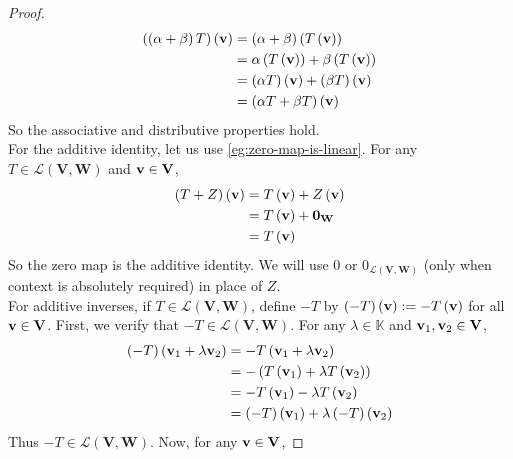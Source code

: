 \begin{proof}
   \begin{align*}
    \left( \left( \alpha + \beta \right)T \right)\left( \vb{v} \right) &= \left( \alpha + \beta \right) \left( T \left( \vb{v} \right) \right) \\
    &= \alpha \left( T \left( \vb{v} \right) \right) + \beta \left( T \left( \vb{v} \right) \right) \\
    &= \left( \alpha T \right) \left( \vb{v} \right) + \left(  \beta T \right) \left(  \vb{v} \right)\\ 
    &= \left(  \alpha T + \beta T \right) \left( \vb{v} \right)
   \end{align*}
   So the associative and distributive properties hold. \\ 
   For the additive identity, let us use \cref{eg:zero-map-is-linear}. For any \( T \in \mathcal{L} \left( \mathbf{V}, \mathbf{W} \right) \) and \( \vb{v} \in \mathbf{V} \), 
   \begin{align*}
    \left( T+Z \right) \left( \vb{v} \right) &= T \left( \vb{v} \right) + Z \left( \vb{v} \right) \\
    &= T \left( \vb{v} \right) + \vb{0}_{\mathbf{W}} \\
    &= T \left( \vb{v} \right)
   \end{align*}
   So the zero map is the additive identity. We will use \( 0 \)  or \( 0_{\mathcal{L} \left( \mathbf{V}, \mathbf{W} \right)} \) (only when context is absolutely required) in place of \( Z \). \\ 
   For additive inverses, if \( T \in \mathcal{L} \left( \mathbf{V}, \mathbf{W} \right) \), define \( -T \) by \( \left( -T \right)\left( \vb{v} \right) := -T \left( \vb{v} \right) \) for all \( \vb{v} \in \mathbf{V} \). First, we verify that \( -T \in \mathcal{L} \left( \mathbf{V}, \mathbf{W} \right) \). For any \( \lambda \in \mathbb{K} \) and \( \vb{v}_{1}, \vb{v}_{2} \in \mathbf{V} \),
   \begin{align*}
       \left( -T \right)\left( \vb{v}_{1} + \lambda \vb{v}_{2} \right) &= -T \left( \vb{v}_{1} + \lambda \vb{v}_{2} \right) \\
       &= -\left( T \left( \vb{v}_{1} \right) + \lambda T \left( \vb{v}_{2} \right) \right) \\
       &= -T \left( \vb{v}_{1} \right) - \lambda T \left( \vb{v}_{2} \right) \\
       &= \left( -T \right)\left( \vb{v}_{1} \right) + \lambda \left( -T \right)\left( \vb{v}_{2} \right)
   \end{align*}
   Thus \( -T \in \mathcal{L} \left( \mathbf{V}, \mathbf{W} \right) \). Now, for any \( \vb{v} \in \mathbf{V} \),

\end{proof}
